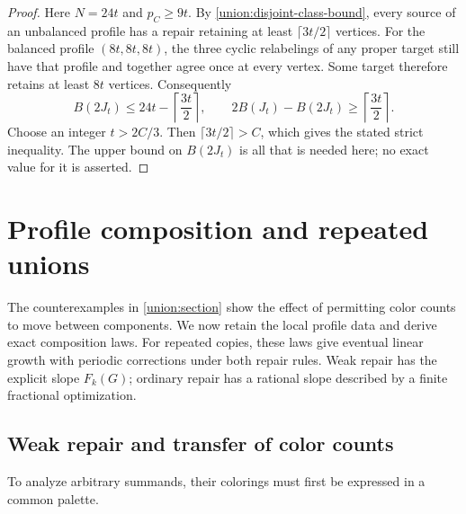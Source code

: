 \documentclass[10pt,a4paper]{amsart}
\numberwithin{equation}{section}
\theoremstyle{definition}
\theoremstyle{remark}
\begin{document}
\begin{proof}
Here $N=24t$ and $p_C\ge9t$. By
\eqref{union:disjoint-class-bound}, every source of an unbalanced
profile has a repair retaining at least $\lceil3t/2\rceil$ vertices.
For the balanced profile $(8t,8t,8t)$, the three cyclic relabelings of
any proper target still have that profile and together agree once
at every vertex. Some target therefore retains at least $8t$ vertices.
Consequently
\[
 B(2J_t)\le24t-\left\lceil\frac{3t}{2}\right\rceil,
 \qquad
 2B(J_t)-B(2J_t)\ge\left\lceil\frac{3t}{2}\right\rceil.
\]
Choose an integer $t>2C/3$. Then $\lceil3t/2\rceil>C$, which gives
the stated strict inequality. The upper bound on $B(2J_t)$ is all
that is needed here; no exact value for it is asserted.
\end{proof}

\section{Profile composition and repeated unions}\label{union:composition-section}

The counterexamples in \cref{union:section} show the effect of permitting
color counts to move between components. We now retain the local profile
data and derive exact composition laws. For repeated copies, these laws
give eventual linear growth with periodic corrections under both repair
rules. Weak repair has the explicit slope $F_k(G)$; ordinary repair has
a rational slope described by a finite fractional optimization.

\subsection{Weak repair and transfer of color counts}
\label{union:weak-general}

To analyze arbitrary summands, their colorings must first be expressed
in a common palette.
\end{document}
